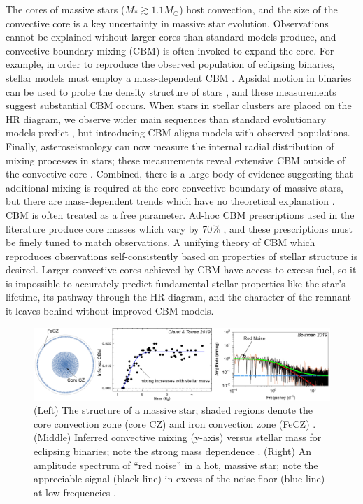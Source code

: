 \documentclass[11pt]{amsart} %
\theoremstyle{definition}
\numberwithin{equation}{section}
\begin{document}
The cores of massive stars ($M_* \gtrsim 1.1 M_\odot$) host convection, and the size of the convective core is a key uncertainty in massive star evolution.
Observations cannot be explained without larger cores than standard models produce, and convective boundary mixing (CBM) is often invoked to expand the core.
For example, in order to reproduce the observed population of eclipsing binaries, stellar models must employ a mass-dependent CBM \citep[see Fig.~\ref{fig:intro}, middle;][]{claret_torres_2019}.
Apsidal motion in binaries can be used to probe the density structure of stars \citep{rosu_etal_2022}, and these measurements suggest substantial CBM occurs.
When stars in stellar clusters are placed on the HR diagram, we observe wider main sequences than standard evolutionary models predict \citep{castro_etal_2014,higgins_vink_2019}, but introducing CBM aligns models with observed populations.
Finally, asteroseismology can now measure the internal radial distribution of mixing processes in stars; these measurements reveal extensive CBM outside of the convective core \citep{michielsen_etal_2019,pedersen_etal_2021}.
Combined, there is a large body of evidence suggesting that additional mixing is required at the core convective boundary of massive stars, but there are mass-dependent trends which have no theoretical explanation \citep{johnston2021}.
CBM is often treated as a free parameter.
Ad-hoc CBM prescriptions used in the literature produce core masses which vary by 70\% \citep{kaiser_etal_2020}, and these prescriptions must be finely tuned to match observations.
A unifying theory of CBM which reproduces observations self-consistently based on properties of stellar structure is desired.
Larger convective cores achieved by CBM have access to excess fuel, so it is impossible to accurately predict fundamental stellar properties like the star's lifetime, its pathway through the HR diagram, and the character of the remnant it leaves behind without improved CBM models.

\begin{figure}[t!]
     \centering
     \captionsetup{width=0.97\linewidth}
     \includegraphics[width=\textwidth]{fig1.png}
        \caption{(Left) The structure of a massive star; shaded regions denote the core convection zone (core CZ) and iron convection zone (FeCZ) \citep{jermyn_etal_2022_atlas}.
        (Middle) Inferred convective mixing (y-axis) versus stellar mass for eclipsing binaries; note the strong mass dependence \citep{claret_torres_2019}.
        (Right) An amplitude spectrum of ``red noise'' in a hot, massive star; note the appreciable signal (black line) in excess of the noise floor (blue line) at low frequencies \citep{bowman_etal_2019}. 
        \label{fig:intro}}
\end{figure}
\end{document}
